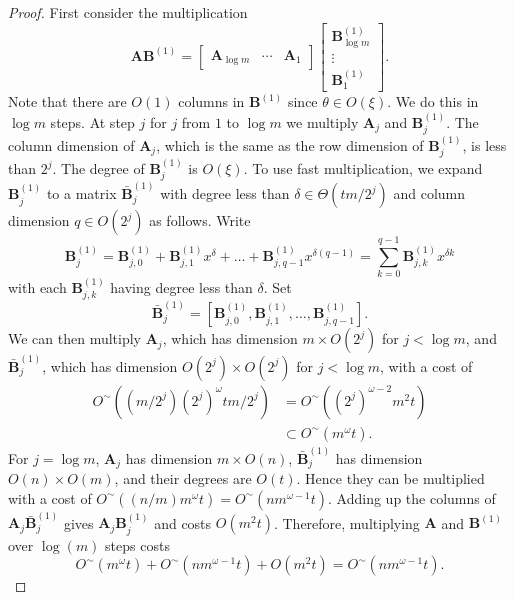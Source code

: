 \begin{proof}
First consider the multiplication 
\[
\mathbf{A}\mathbf{B}^{\left(1\right)}=\left[\begin{array}{ccc}
\mathbf{A}_{\log m} & \cdots & \mathbf{A}_{1}\end{array}\right]\left[\begin{array}{l}
\mathbf{B}_{\log m}^{\left(1\right)}\\
\vdots\\
\mathbf{B}_{1}^{\left(1\right)}
\end{array}\right].
\]
 Note that there are $O\left(1\right)$ columns in $\mathbf{B}^{(1)}$
since $\theta\in O\left(\xi\right)$. We do this in $\log m$ steps.
At step $j$ for $j$ from $1$ to $\log m$ we multiply $\mathbf{A}_{j}$
and $\mathbf{B}_{j}^{(1)}$. The column dimension of $\mathbf{A}_{j}$,
which is the same as the row dimension of $\mathbf{B}_{j}^{(1)}$,
is less than $2^{j}$. The degree of $\mathbf{B}_{j}^{(1)}$ is $O\left(\xi\right)$.
To use fast multiplication, we expand $\mathbf{B}_{j}^{(1)}$ to a
matrix $\bar{\mathbf{B}}_{j}^{(1)}$ with degree less than $\delta\in\Theta(tm/2^{j})$
and column dimension $q\in O(2^{j})$ as follows. Write 
\[
\mathbf{B}_{j}^{(1)}=\mathbf{B}_{j,0}^{(1)}+\mathbf{B}_{j,1}^{(1)}x^{\delta}+\dots+\mathbf{B}_{j,q-1}^{(1)}x^{\delta(q-1)}=\sum_{k=0}^{q-1}\mathbf{B}_{j,k}^{(1)}x^{\delta k}
\]
 with each $\mathbf{B}_{j,k}^{(1)}$ having degree less than $\delta.$
Set 
\[
\bar{\mathbf{B}}_{j}^{(1)}=\left[\mathbf{B}_{j,0}^{(1)},\mathbf{B}_{j,1}^{(1)},\dots,\mathbf{B}_{j,q-1}^{(1)}\right].
\]
 We can then multiply $\mathbf{A}_{j}$, which has dimension $m\times O(2^{j})$
for $j<\log m$, and $\bar{\mathbf{B}}_{j}^{(1)}$, which has dimension
$O(2^{j})\times O(2^{j})$ for $j<\log m$, with a cost of 
\begin{align*}
O^{\sim}\left((m/2^{j})\left(2^{j}\right)^{\omega}tm/2^{j}\right) & =O^{\sim}\left(\left(2^{j}\right)^{\omega-2}m^{2}t\right)\\
 & \subset O^{\sim}\left(m^{\omega}t\right).
\end{align*}
 For $j=\log m$, $\mathbf{A}_{j}$ has dimension $m\times O\left(n\right)$,
$\bar{\mathbf{B}}_{j}^{\left(1\right)}$ has dimension $O\left(n\right)\times O(m)$,
and their degrees are $O\left(t\right)$. Hence they can be multiplied
with a cost of $O^{\sim}\left((n/m)m^{\omega}t\right)=O^{\sim}\left(nm^{\omega-1}t\right)$.
Adding up the columns of $\mathbf{A}_{j}\bar{\mathbf{B}}_{j}^{(1)}$
gives $\mathbf{A}_{j}\mathbf{B}_{j}^{(1)}$ and costs $O(m^{2}t)$.
Therefore, multiplying $\mathbf{A}$ and $\mathbf{B}^{(1)}$ over
$\log(m)$ steps costs 
\[
O^{\sim}\left(m^{\omega}t\right)+O^{\sim}\left(nm^{\omega-1}t\right)+O(m^{2}t)=O^{\sim}\left(nm^{\omega-1}t\right).
\]



\end{proof}
